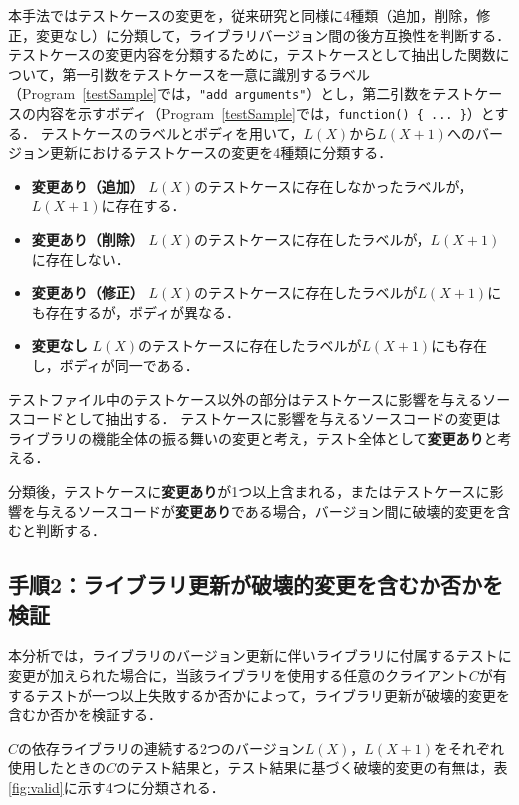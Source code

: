 \documentclass[submit]{ipsj}
\begin{document}
本手法ではテストケースの変更を，従来研究と同様に4種類（追加，削除，修正，変更なし）に分類して，ライブラリバージョン間の後方互換性を判断する．
テストケースの変更内容を分類するために，テストケースとして抽出した関数について，第一引数をテストケースを一意に識別するラベル（Program~\ref{testSample}では，{\verb|"add arguments"|}）とし，第二引数をテストケースの内容を示すボディ（Program~\ref{testSample}では，{\verb|function() { ... }|}）とする．
テストケースのラベルとボディを用いて，$L(X)$から$L(X+1)$へのバージョン更新におけるテストケースの変更を4種類に分類する．

\begin{itemize}
\item \textbf{変更あり（追加）} $L(X)$のテストケースに存在しなかったラベルが，$L(X+1)$に存在する．
\item \textbf{変更あり（削除）} $L(X)$のテストケースに存在したラベルが，$L(X+1)$に存在しない．
\item \textbf{変更あり（修正）} $L(X)$のテストケースに存在したラベルが$L(X+1)$にも存在するが，ボディが異なる．
\item \textbf{変更なし} $L(X)$のテストケースに存在したラベルが$L(X+1)$にも存在し，ボディが同一である．
\end{itemize}

テストファイル中のテストケース以外の部分はテストケースに影響を与えるソースコードとして抽出する．
テストケースに影響を与えるソースコードの変更はライブラリの機能全体の振る舞いの変更と考え，テスト全体として\textbf{変更あり}と考える．

分類後，テストケースに\textbf{変更あり}が1つ以上含まれる，またはテストケースに影響を与えるソースコードが\textbf{変更あり}である場合，バージョン間に破壊的変更を含むと判断する．

\subsection{手順2：ライブラリ更新が破壊的変更を含むか否かを検証}
\label{sec:step2}

本分析では，ライブラリのバージョン更新に伴いライブラリに付属するテストに変更が加えられた場合に，当該ライブラリを使用する任意のクライアント$C$が有するテストが一つ以上失敗するか否かによって，ライブラリ更新が破壊的変更を含むか否かを検証する．

$C$の依存ライブラリの連続する2つのバージョン$L(X)$，$L(X+1)$をそれぞれ使用したときの$C$のテスト結果と，テスト結果に基づく破壊的変更の有無は，表\ref{fig:valid}に示す4つに分類される．
\end{document}
